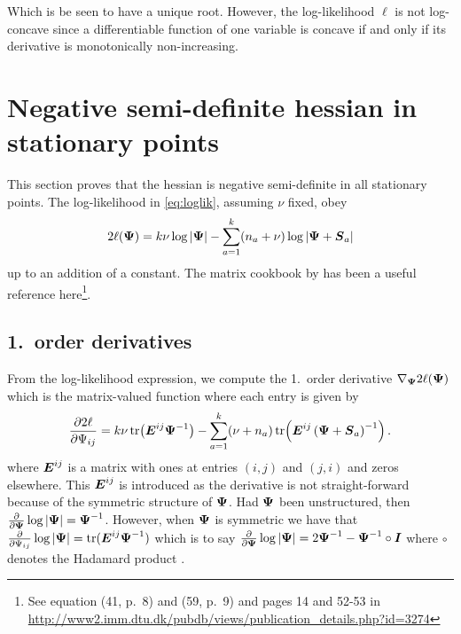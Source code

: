 \documentclass{article}\usepackage[]{graphicx}\usepackage[]{color}
\newenvironment{knitrout}{}{} %
\begin{document}
\begin{knitrout}
\end{knitrout}
Which is be seen to have a unique root.
However, the log-likelihood $\ell$ is not log-concave since a differentiable function of one variable is concave if and only if its derivative is monotonically non-increasing.




\section{Negative semi-definite hessian in stationary points}
\label{sec:negativedefinite}
This section proves that the hessian is negative semi-definite in all stationary points.
The log-likelihood in \eqref{eq:loglik}, assuming $\nu$ fixed, obey
\begin{align}
  2\ell({\boldsymbol{\Psi}})
  = k\nu\log|{\boldsymbol{\Psi}}| - \sum_{a=1}^k (n_a + \nu)\log|{\boldsymbol{\Psi}} + {\boldsymbol{S}}_a|
\label{eq:loglik2}
\end{align}
up to an addition of a constant. The matrix cookbook by \citet{Petersen2008} has been a useful reference here\footnote{See equation (41, p.\ 8) and (59, p.\ 9) and pages 14 and 52-53 in \url{http://www2.imm.dtu.dk/pubdb/views/publication_details.php?id=3274}}.

\subsection{1.\ order derivatives}
From the log-likelihood expression, we compute the 1.\ order derivative $\nabla_{\boldsymbol{\Psi}} 2\ell({\boldsymbol{\Psi}})$ which is the matrix-valued function
where each entry is given by
\begin{align}
  \frac{\partial 2\ell}{\partial \Psi_{ij}}
  = k\nu\operatorname*{tr}\!\left({\boldsymbol{E}}^{ij}{\boldsymbol{\Psi}}^{-1}\right)
    - \sum_{a = 1}^k (\nu + n_a)\operatorname*{tr}\!\left({\boldsymbol{E}}^{ij}\left({\boldsymbol{\Psi}} + {\boldsymbol{S}}_a\right)^{-1}\right).
\label{eq:dloglik}
\end{align}
where ${\boldsymbol{E}}^{ij}$ is a matrix with ones at entries $(i,j)$ and $(j,i)$ and zeros elsewhere.
This ${\boldsymbol{E}}^{ij}$ is introduced as the derivative is not straight-forward because of the symmetric structure of ${\boldsymbol{\Psi}}$. Had ${\boldsymbol{\Psi}}$ been unstructured, then $\frac{\partial}{\partial {\boldsymbol{\Psi}}}\log|{\boldsymbol{\Psi}}| = {\boldsymbol{\Psi}}^{-1}$.
However, when ${\boldsymbol{\Psi}}$ is symmetric we have that $\frac{\partial}{\partial \Psi_{ij}}\log|{\boldsymbol{\Psi}}| = \operatorname*{tr}({\boldsymbol{E}}^{ij}{\boldsymbol{\Psi}}^{-1})$ which is to say $\frac{\partial}{\partial {\boldsymbol{\Psi}}}\log|{\boldsymbol{\Psi}}| = 2{\boldsymbol{\Psi}}^{-1} -{\boldsymbol{\Psi}}^{-1} \circ {\boldsymbol{I}}$ where $\circ$ denotes the Hadamard product \citep[eq.\ (43) and (141)]{Petersen2008}.
\end{document}
